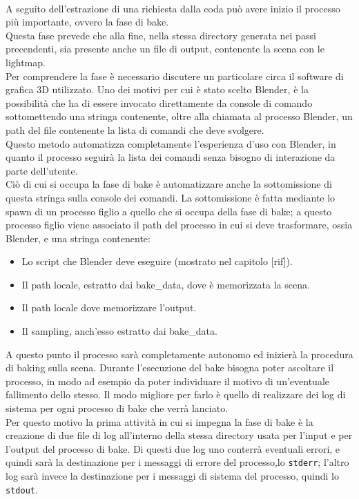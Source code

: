 \\
A seguito dell’estrazione di una richiesta dalla coda può avere inizio il processo più importante, ovvero la fase di bake. 
\\
Questa fase prevede che alla fine, nella stessa directory generata nei passi precendenti, sia presente anche un file di output, contenente la scena con le lightmap. 
\\
Per comprendere la fase è necessario discutere un particolare circa il software di grafica 3D utilizzato. Uno dei motivi per cui è stato scelto Blender, è la possibilità che ha di essere invocato direttamente da console di comando sottomettendo una stringa contenente, oltre alla chiamata al processo Blender, un path del file contenente la lista di comandi che deve svolgere. 
\\
Questo metodo automatizza completamente l’esperienza d’uso con Blender, in quanto il processo seguirà la lista dei comandi senza bisogno di interazione da parte dell’utente.
\\ 
Ciò di cui si occupa la fase di bake è automatizzare anche la sottomissione di questa stringa sulla console dei comandi. La sottomissione è fatta mediante lo spawn di un processo figlio a quello che si occupa della fase di bake; a questo processo figlio viene associato il path del processo in cui si deve trasformare, ossia Blender, e una stringa contenente:
\begin{itemize}
\item Lo script che Blender deve eseguire (mostrato nel capitolo [rif]).
\item Il path locale, estratto dai bake\_data, dove è memorizzata la scena.
\item Il path locale dove memorizzare l’output.
\item Il sampling, anch’esso estratto dai bake\_data.
\end{itemize}
A questo punto il processo sarà completamente autonomo ed inizierà la procedura di baking sulla scena. Durante l’esecuzione del bake bisogna poter ascoltare il processo, in modo ad esempio da poter individuare il motivo di un’eventuale fallimento dello stesso. Il modo migliore per farlo è quello di realizzare dei log di sistema per ogni processo di bake che verrà lanciato.
\\ 
Per questo motivo la prima attività in cui si impegna la fase di bake è la creazione di due file di log all’interno della stessa directory usata per l’input e per l’output del processo di bake. Di questi due log uno conterrà eventuali errori, e quindi sarà la destinazione per i messaggi di errore del processo,lo \texttt{stderr}; l’altro log sarà invece la destinazione per i messaggi di sistema del processo, quindi lo \texttt{stdout}. 
